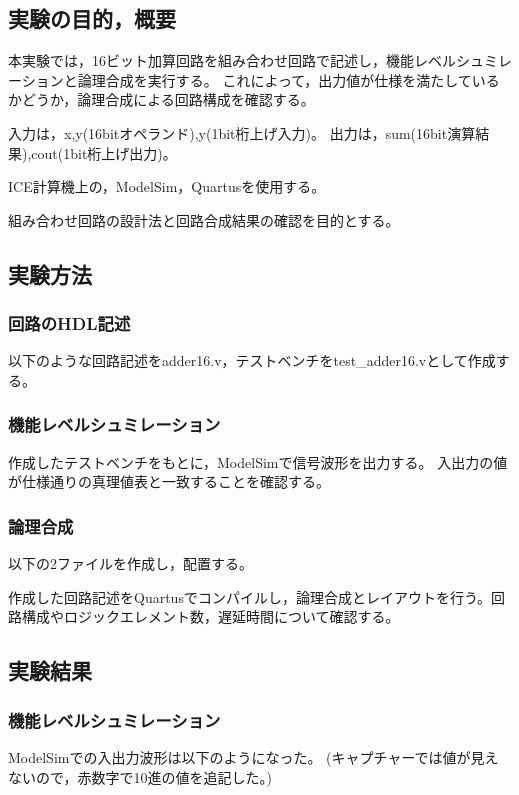 
\subsection{実験の目的，概要}
本実験では，16ビット加算回路を組み合わせ回路で記述し，機能レベルシュミレーションと論理合成を実行する。
これによって，出力値が仕様を満たしているかどうか，論理合成による回路構成を確認する。

入力は，x,y(16bitオペランド),y(1bit桁上げ入力)。
出力は，sum(16bit演算結果),cout(1bit桁上げ出力)。

ICE計算機上の，ModelSim，Quartusを使用する。

組み合わせ回路の設計法と回路合成結果の確認を目的とする。

\subsection{実験方法}
\subsubsection{回路のHDL記述}
以下のような回路記述をadder16.v，テストベンチをtest\_adder16.vとして作成する。



\subsubsection{機能レベルシュミレーション}
作成したテストベンチをもとに，ModelSimで信号波形を出力する。
入出力の値が仕様通りの真理値表と一致することを確認する。

\subsubsection{論理合成}
以下の2ファイルを作成し，配置する。



作成した回路記述をQuartusでコンパイルし，論理合成とレイアウトを行う。回路構成やロジックエレメント数，遅延時間について確認する。
 
\subsection{実験結果}
\subsubsection{機能レベルシュミレーション}
ModelSimでの入出力波形は以下のようになった。
(キャプチャーでは値が見えないので，赤数字で10進の値を追記した。)

